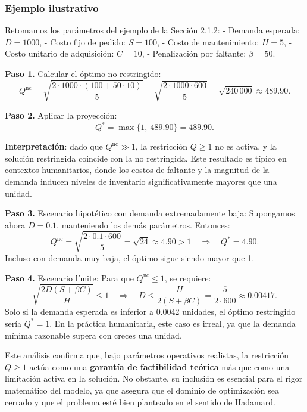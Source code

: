 \documentclass[
  spanish,
  us-letterpaper,
  DIV=11,
  numbers=noendperiod]{scrreprt}
\numberwithin{equation}{section}
\begin{document}
\subsubsection{Ejemplo ilustrativo}\label{ejemplo-ilustrativo-7}

Retomamos los parámetros del ejemplo de la Sección 2.1.2: - Demanda
esperada: \(D = 1000\), - Costo fijo de pedido: \(S = 100\), - Costo de
mantenimiento: \(H = 5\), - Costo unitario de adquisición: \(C = 10\), -
Penalización por faltante: \(\beta = 50\).

\textbf{Paso 1.} Calcular el óptimo no restringido: \[
Q^{\text{nc}} = \sqrt{\frac{2 \cdot 1000 \cdot (100 + 50 \cdot 10)}{5}} = \sqrt{\frac{2 \cdot 1000 \cdot 600}{5}} = \sqrt{240\,000} \approx 489.90.
\]

\textbf{Paso 2.} Aplicar la proyección: \[
Q^* = \max\{1,\ 489.90\} = 489.90.
\]

\textbf{Interpretación}: dado que \(Q^{\text{nc}} \gg 1\), la
restricción \(Q \geq 1\) no es activa, y la solución restringida
coincide con la no restringida. Este resultado es típico en contextos
humanitarios, donde los costos de faltante y la magnitud de la demanda
inducen niveles de inventario significativamente mayores que una unidad.

\textbf{Paso 3.} Escenario hipotético con demanda extremadamente baja:
Supongamos ahora \(D = 0.1\), manteniendo los demás parámetros.
Entonces: \[
Q^{\text{nc}} = \sqrt{\frac{2 \cdot 0.1 \cdot 600}{5}} = \sqrt{24} \approx 4.90 > 1 \quad \Rightarrow \quad Q^* = 4.90.
\] Incluso con demanda muy baja, el óptimo sigue siendo mayor que 1.

\textbf{Paso 4.} Escenario límite: Para que \(Q^{\text{nc}} \leq 1\), se
requiere: \[
\sqrt{\frac{2 D (S + \beta C)}{H}} \leq 1
\quad \Longrightarrow \quad
D \leq \frac{H}{2(S + \beta C)} = \frac{5}{2 \cdot 600} \approx 0.00417.
\] Solo si la demanda esperada es inferior a 0.0042 unidades, el óptimo
restringido sería \(Q^* = 1\). En la práctica humanitaria, este caso es
irreal, ya que la demanda mínima razonable supera con creces una unidad.

Este análisis confirma que, bajo parámetros operativos realistas, la
restricción \(Q \geq 1\) actúa como una \textbf{garantía de factibilidad
teórica} más que como una limitación activa en la solución. No obstante,
su inclusión es esencial para el rigor matemático del modelo, ya que
asegura que el dominio de optimización sea cerrado y que el problema
esté bien planteado en el sentido de Hadamard.
\end{document}
